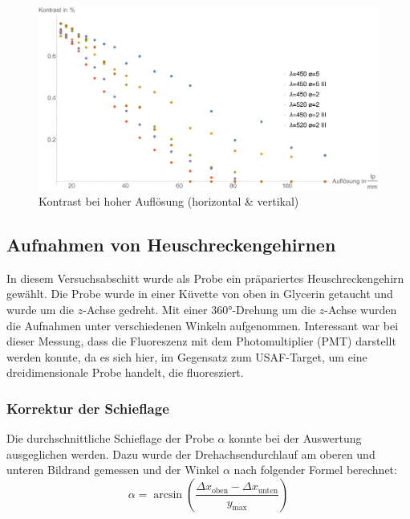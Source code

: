 \begin{figure}[H]
\centering
\includegraphics[width=1.0\linewidth]{IMAGE/Versuch2Plot2_all.pdf}
	\caption{Kontrast bei hoher Auflösung (horizontal \& vertikal)}
	\label{fig:Versuch2_Plot2_all}
\end{figure}



\subsection{Aufnahmen von Heuschreckengehirnen}
In diesem Versuchsabschitt wurde als Probe ein präpariertes Heuschreckengehirn gewählt.
Die Probe wurde in einer Küvette von oben in Glycerin getaucht und wurde um die $z$-Achse gedreht.
Mit einer 360°-Drehung um die $z$-Achse wurden die Aufnahmen unter verschiedenen Winkeln aufgenommen.
Interessant war bei dieser Messung, dass die Fluoreszenz mit dem Photomultiplier (PMT) darstellt werden konnte, da es sich hier, im Gegensatz zum USAF-Target, um eine dreidimensionale Probe handelt, die fluoresziert.

\subsubsection{Korrektur der Schieflage}
Die durchschnittliche Schieflage der Probe $\alpha$ konnte bei der Auswertung ausgeglichen werden.
Dazu wurde der Drehachsendurchlauf am oberen und unteren Bildrand gemessen und der Winkel $\alpha$ nach folgender Formel berechnet:
$$\alpha = \arcsin \left( \frac{\Delta{x_{\text{oben}}} - \Delta{x_{\text{unten}}}}{y_{\text{max}}} \right)$$

